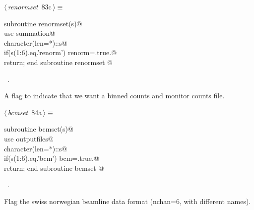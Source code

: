\documentclass[10pt,a4paper,notitlepage]{article}
\begin{document}
\begin{flushleft} \small
\begin{minipage}{\linewidth}\label{scrap102}\raggedright\small
{} $\langle\,${\it renormset}\nobreak\ {\footnotesize {83c}}$\,\rangle\equiv$
\vspace{-1ex}
\begin{list}{}{} \item
\mbox{}\verb@      subroutine renormset(s)@\\
\mbox{}\verb@      use summation@\\
\mbox{}\verb@      character(len=*)::s@\\
\mbox{}\verb@      if(s(1:6).eq.'renorm') renorm=.true.@\\
\mbox{}\verb@      return; end subroutine renormset                                    @{\NWsep}
\end{list}
\vspace{-1.5ex}
\footnotesize
\begin{list}{}{\setlength{\itemsep}{-\parsep}\setlength{\itemindent}{-\leftmargin}}
\item \NWtxtMacroRefIn\ .

\item{}
\end{list}
\end{minipage}\vspace{4ex}
\end{flushleft}
A flag to indicate that we want a binned counts and monitor counts file.

\begin{flushleft} \small
\begin{minipage}{\linewidth}\label{scrap103}\raggedright\small
{} $\langle\,${\it bcmset}\nobreak\ {\footnotesize {84a}}$\,\rangle\equiv$
\vspace{-1ex}
\begin{list}{}{} \item
\mbox{}\verb@      subroutine bcmset(s)@\\
\mbox{}\verb@      use outputfiles@\\
\mbox{}\verb@      character(len=*)::s@\\
\mbox{}\verb@      if(s(1:6).eq.'bcm') bcm=.true.@\\
\mbox{}\verb@      return; end subroutine bcmset                                       @{\NWsep}
\end{list}
\vspace{-1.5ex}
\footnotesize
\begin{list}{}{\setlength{\itemsep}{-\parsep}\setlength{\itemindent}{-\leftmargin}}
\item \NWtxtMacroRefIn\ .

\item{}
\end{list}
\end{minipage}\vspace{4ex}
\end{flushleft}
Flag the swiss norwegian beamline data format (nchan=6, with different names).
\end{document}
